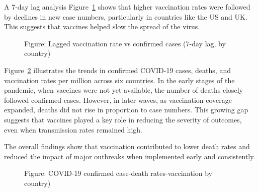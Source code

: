 \documentclass[
  11pt,
]{article}
\begin{document}
A 7-day lag analysis Figure~\ref{fig-lag-effect} shows that higher
vaccination rates were followed by declines in new case numbers,
particularly in countries like the US and UK. This suggests that
vaccines helped slow the spread of the virus.

\begin{figure}


\caption{\label{fig-lag-effect}Figure: Lagged vaccination rate vs
confirmed cases (7-day lag, by country)}

\end{figure}%

Figure~\ref{fig-case-death-vacc} illustrates the trends in confirmed
COVID-19 cases, deaths, and vaccination rates per million across six
countries. In the early stages of the pandemic, when vaccines were not
yet available, the number of deaths closely followed confirmed cases.
However, in later waves, as vaccination coverage expanded, deaths did
not rise in proportion to case numbers. This growing gap suggests that
vaccines played a key role in reducing the severity of outcomes, even
when transmission rates remained high.

The overall findings show that vaccination contributed to lower death
rates and reduced the impact of major outbreaks when implemented early
and consistently.

\begin{figure}


\caption{\label{fig-case-death-vacc}Figure: COVID-19 confirmed
case-death rates-vaccination by country)}

\end{figure}%
\end{document}
